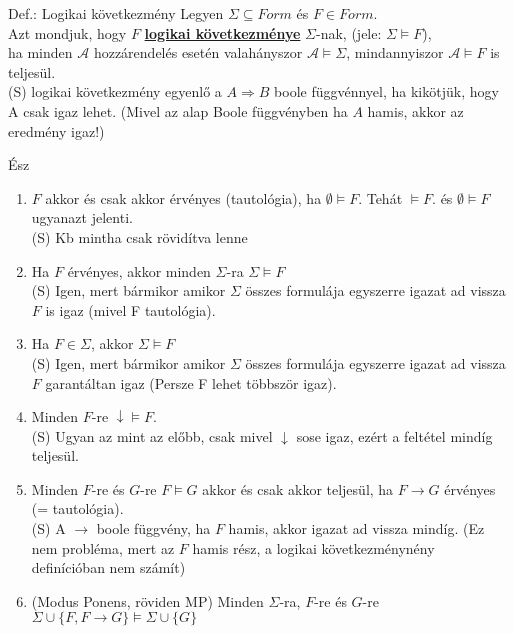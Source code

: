 \documentclass{beamer}
\begin{document}
\begin{frame}
\begin{block}{Def.: Logikai következmény}
Legyen $\Sigma \subseteq Form$ és $F \in Form$.\\
Azt mondjuk, hogy $F$ \underline{\textbf{logikai következménye}} $\Sigma$-nak, (jele: $\Sigma \models F$),\\
ha minden $\mathcal{A}$ hozzárendelés esetén valahányszor $\mathcal{A} \models \Sigma$, mindannyiszor $\mathcal{A} \models F$ is teljesül.\\
{\tiny (S) logikai következmény egyenlő a $A \Rightarrow B$ boole függvénnyel, ha kikötjük, hogy A csak igaz lehet. (Mivel az alap Boole függvényben ha $A$ hamis, akkor az eredmény igaz!)}
\end{block}
\medskip
\begin{block}{Ész}
\begin{enumerate}
\item $F$ akkor és csak akkor érvényes (tautológia), ha $\emptyset \models F$. Tehát $\models F$. és $\emptyset \models F$ ugyanazt jelenti.\\
{\tiny (S) Kb mintha csak rövidítva lenne}\\
\item Ha $F$ érvényes, akkor minden $\Sigma$-ra $\Sigma \models F$\\
{\tiny (S) Igen, mert bármikor amikor $\Sigma$ összes formulája egyszerre igazat ad vissza $F$ is igaz (mivel F tautológia).}\\
\item Ha $F \in \Sigma$, akkor $\Sigma \models F$\\
{\tiny (S) Igen, mert bármikor amikor $\Sigma$ összes formulája egyszerre igazat ad vissza $F$ garantáltan igaz (Persze F lehet többször igaz).}\\
\item Minden $F$-re $\downarrow \models F$.\\
{\tiny (S) Ugyan az mint az előbb, csak mivel $\downarrow$ sose igaz, ezért a feltétel mindíg teljesül.}\\
\item Minden $F$-re és $G$-re $F \models G$ akkor és csak akkor teljesül, ha $F \rightarrow G$ érvényes (= tautológia).\\
{\tiny (S) A $\rightarrow$ boole függvény, ha $F$ hamis, akkor igazat ad vissza mindíg. (Ez nem probléma, mert az $F$ hamis rész, a logikai következménynény definícióban nem számít)}\\
\item (Modus Ponens, röviden MP) Minden $\Sigma$-ra, $F$-re és $G$-re $\Sigma \cup \{F, F \rightarrow G\} \models \Sigma \cup \{G\}$\\

\end{enumerate}
\end{block}
\end{frame}
\end{document}

